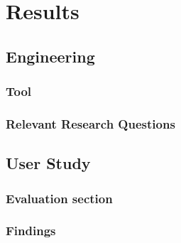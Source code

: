 \chapter{Results}
\label{chap:results}







\section{Engineering}

\subsection{Tool}

\subsection{Relevant Research Questions}

\section{User Study}

\subsection{Evaluation section}


\FloatBarrier %

\subsection{Findings}


